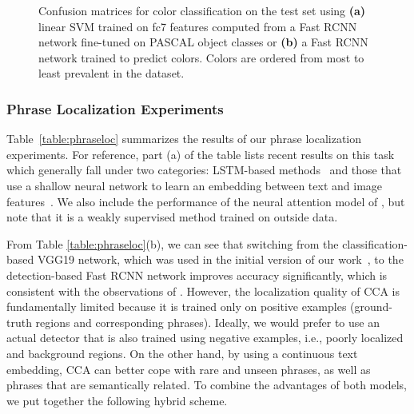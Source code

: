 \documentclass[twocolumn]{svjour3}
\begin{document}
\begin{figure*}
\centering
{}
\hspace{0.4cm}
\vspace{-3mm}
\caption{Confusion matrices for color classification on the test set using {\bf (a)} linear SVM trained on fc7 features computed from a Fast RCNN network fine-tuned on PASCAL object classes or {\bf (b)} a Fast RCNN network trained to predict colors. Colors are ordered from most to least prevalent in the dataset.}
\label{fig:colorConfusion}
\end{figure*}

\subsubsection{Phrase Localization Experiments}

Table~\ref{table:phraseloc} summarizes the results of our phrase localization experiments. For reference, part (a) of the table lists recent results on this task which generally fall under two categories: LSTM-based methods~\citep{hu2016natural,rohrbach2015,fukui16emnlp} and those that use a shallow neural network to learn an embedding between text and image features~\citep{deepspite2015,wang2016matching}.
We also include the performance of the neural attention model of \citet{zhang2016EB}, but note that it is a weakly supervised method trained on outside data. 

From Table \ref{table:phraseloc}(b), we can see that switching from the classification-based VGG19 network, which was used in the initial version of our work~\citep{flickrentities}, to the detection-based Fast RCNN network improves accuracy significantly, which is consistent with the observations of \citet{rohrbach2015}. However, the localization quality of CCA is fundamentally limited because it is trained only on positive examples (ground-truth regions and corresponding phrases). Ideally, we would prefer to use an actual detector that is also trained using negative examples, i.e., poorly localized and background regions. On the other hand, by using a continuous text embedding, CCA can better cope with rare and unseen phrases, as well as phrases that are semantically related. To combine the advantages of both models, we put together the following hybrid scheme. 
\end{document}

